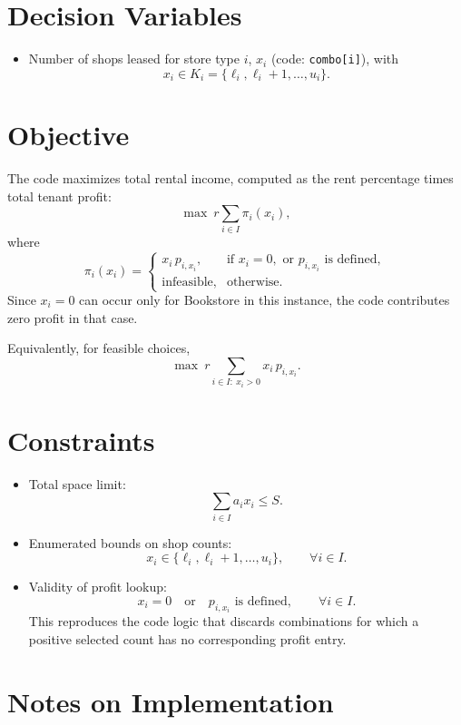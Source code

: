 \section*{Decision Variables}

\begin{itemize}
    \item Number of shops leased for store type $i$, $x_i$ (code: \texttt{combo[i]}), with
    \[
    x_i \in K_i=\{\ell_i,\ell_i+1,\dots,u_i\}.
    \]
\end{itemize}

\section*{Objective}

The code maximizes total rental income, computed as the rent percentage times total tenant profit:
\[
\max \ r \sum_{i\in I} \pi_i(x_i),
\]
where
\[
\pi_i(x_i)=
\begin{cases}
x_i\,p_{i,x_i}, & \text{if } x_i=0, \text{ or } p_{i,x_i}\text{ is defined},\\
\text{infeasible}, & \text{otherwise}.
\end{cases}
\]
Since $x_i=0$ can occur only for Bookstore in this instance, the code contributes zero profit in that case.

Equivalently, for feasible choices,
\[
\max \ r \sum_{i\in I:\ x_i>0} x_i\,p_{i,x_i}.
\]

\section*{Constraints}

\begin{itemize}
    \item Total space limit:
    \[
    \sum_{i\in I} a_i x_i \le S.
    \]
    \item Enumerated bounds on shop counts:
    \[
    x_i \in \{\ell_i,\ell_i+1,\dots,u_i\}, \qquad \forall i\in I.
    \]
    \item Validity of profit lookup:
    \[
    x_i=0 \quad \text{or} \quad p_{i,x_i}\text{ is defined}, \qquad \forall i\in I.
    \]
    This reproduces the code logic that discards combinations for which a positive selected count has no corresponding profit entry.
\end{itemize}

\section*{Notes on Implementation}

